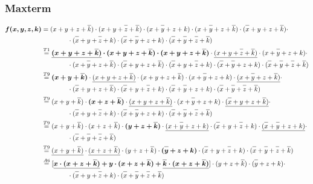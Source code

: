 \documentclass{article}
\newcommand*{\oline}[1]{\overline{#1\mathstrut}}
\newcommand{\bigspace}{\quad\quad\quad\quad}
\begin{document}
\subsubsection*{Maxterm}
\begin{align*}
  \bm{f(x,y,z,k)} &= (x+y+z+\oline{k}) \cdot (x+y+\oline{z}+\oline{k}) \cdot (x+\oline{y}+z+k) \cdot (x+\oline{y}+z+\oline{k}) \cdot (\oline{x}+y+z+\oline{k}) \cdot \\
  &\bigspace \cdot (\oline{x}+y+\oline{z}+k) \cdot (\oline{x}+\oline{y}+z+k) \cdot (\oline{x}+\oline{y}+\oline{z}+\oline{k})\\
  &\overset{T1}{=} \bm{\underline{(x+y+z+\oline{k})} \cdot (x+y+z+\oline{k}) \cdot (x+y+z+\oline{k})} \cdot \underline{(x+y+\oline{z}+\oline{k})} \cdot (x+\oline{y}+z+k) \cdot \\
  &\bigspace \cdot (x+\oline{y}+z+\oline{k}) \cdot (\oline{x}+y+z+\oline{k}) \cdot (\oline{x}+y+\oline{z}+k) \cdot (\oline{x}+\oline{y}+z+k) \cdot (\oline{x}+\oline{y}+\oline{z}+\oline{k})\\
  &\overset{T9}{=} \bm{(x+y+\oline{k})} \cdot \underline{(x+y+z+\oline{k})} \cdot (x+y+z+\oline{k}) \cdot (x+\oline{y}+z+k) \cdot \underline{(x+\oline{y}+z+\oline{k})} \cdot \\
  &\bigspace \cdot (\oline{x}+y+z+\oline{k}) \cdot (\oline{x}+y+\oline{z}+k) \cdot (\oline{x}+\oline{y}+z+k) \cdot (\oline{x}+\oline{y}+\oline{z}+\oline{k})\\
  &\overset{T9}{=} (x+y+\oline{k}) \cdot \bm{(x+z+\oline{k})} \cdot \underline{(x+y+z+\oline{k})} \cdot (x+\oline{y}+z+k) \cdot \underline{(\oline{x}+y+z+\oline{k})} \cdot\\
  &\bigspace \cdot (\oline{x}+y+\oline{z}+k) \cdot (\oline{x}+\oline{y}+z+k) \cdot (\oline{x}+\oline{y}+\oline{z}+\oline{k})\\
  &\overset{T9}{=} (x+y+\oline{k}) \cdot (x+z+\oline{k}) \cdot \bm{(y+z+\oline{k})} \cdot \underline{(x+\oline{y}+z+k)} \cdot (\oline{x}+y+\oline{z}+k) \cdot \underline{(\oline{x}+\oline{y}+z+k)} \cdot\\
  &\bigspace \cdot (\oline{x}+\oline{y}+\oline{z}+\oline{k})\\
  &\overset{T9}{=} \underline{(x+y+\oline{k})} \cdot \underline{(x+z+\oline{k})} \cdot (y+z+\oline{k}) \cdot \bm{(\oline{y}+z+k)} \cdot (\oline{x}+y+\oline{z}+k) \cdot (\oline{x}+\oline{y}+\oline{z}+\oline{k})\\
  &\overset{A6}{=} [\bm{\underline{x \cdot (x+z+\oline{k})} + y \cdot (x+z+\oline{k}) + \underline{\oline{k} \cdot (x+z+\oline{k})}}] \cdot (y+z+\oline{k}) \cdot (\oline{y}+z+k) \cdot\\
  &\bigspace \cdot (\oline{x}+y+\oline{z}+k) \cdot (\oline{x}+\oline{y}+\oline{z}+\oline{k})
\end{align*}
\end{document}
